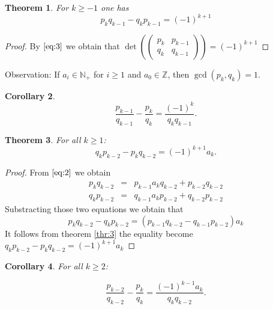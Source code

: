 \documentclass[a4paper,11pt,american]{article}
\newcommand{\N}{\mathbb{N}}
\newcommand{\Z}{\mathbb{Z}}
\theoremstyle{plain}
\newtheorem{theorem}{Theorem}
\newtheorem{corollary}[theorem]{Corollary}
\theoremstyle{definition}
\begin{document}
\begin{theorem}
  \label{thr:3}
  For $k\geq -1$ one has
  \begin{displaymath}
    p_k q_{k-1} - q_k p_{k-1} = (-1)^{k+1} 
  \end{displaymath}
\end{theorem}
\begin{proof}
    By $\eqref{eq:3}$ we obtain that $\det(\begin{pmatrix}
    p_k & p_{k-1} \\
    q_k & q_{k-1}
  \end{pmatrix})=(-1)^{k+1}$
\end{proof}
Observation: If $a_i \in\N_+$ for $i\geq1$ and $a_0 \in\Z$, then $\gcd(p_k,q_k) = 1$.
\begin{corollary}
  \label{co:1}
  \begin{equation}
    \label{eq:4}
      \frac{p_{k-1}}{q_{k-1}} - \frac{p_k}{q_k} = \frac{(-1)^k }{q_k q_{k-1}}.    
  \end{equation}

\end{corollary}

\begin{theorem}
  For all $k\geq 1$:
  \begin{displaymath}
    q_k p_{k-2} - p_k q_{k-2} = (-1)^ {k+1} a_k. 
  \end{displaymath}
\end{theorem}
\begin{proof}
    From $\eqref{eq:2}$ we obtain \begin{equation}
        \label{eq:5}\begin{array}{rcl}
         p_ kq_{k-2} &=&  p_{k-1} a_kq_{k-2} + p_{k-2}q_{k-2}\\
        q_ kp_{k-2}  &=& q_{k-1} a_kp_{k-2} + q_{k-2}p_{k-2}
        \end{array}
    \end{equation}
    Substracting those two equations we obtain that 
    $$ p_ kq_{k-2}-q_ kp_{k-2}=(p_{k-1}q_{k-2}-q_{k-1}p_{k-2})a_k$$
    It follows from theorem \eqref{thr:3} the equality become $q_k p_{k-2} - p_k q_{k-2} = (-1)^ {k+1} a_k$
\end{proof}

\begin{corollary}
  \label{co:2}
  For all $k\geq 2$:

  \begin{displaymath}
    \frac{p_{k-2}}{q_{k-2}} -    \frac{p_k}{q_k} = \frac{(-1)^{k-1} a_k}{q_k q_{k-2}}. 
  \end{displaymath}
\end{corollary}
\end{document}
